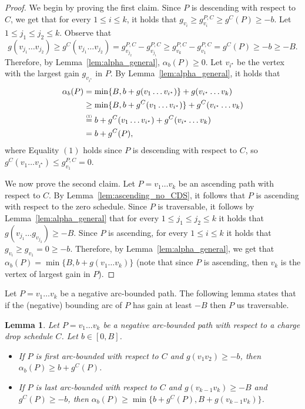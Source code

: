 \documentclass[11pt]{article}
\newtheorem{lemma}[theorem]{Lemma}
\newcommand\numeq[1]{\stackrel{\scriptscriptstyle(\mkern-1.5mu#1\mkern-1.5mu)}{=}}
\begin{document}
\begin{proof}
    We begin by proving the first claim. Since $P$ is descending with respect to $C$, we get that for every $1\le i \le k$, it holds that $g_{v_{i}} \ge g^{P,C}_{v_i} \ge g^C(P) \ge -b$. Let $1\le j_1 \le j_2 \le k$. Observe that
    \[g(v_{j_1} \ldots v_{j_2}) \ge g^C(v_{j_1} \ldots v_{j_2})  = g^{P,C}_{v_{j_2}} - g^{P,C}_{v_{j_1}} 
    \ge g^{P,C}_{v_{k}} - g^{P,C}_{v_{1}} = g^C(P) \ge -b \ge -B.
    \]
    Therefore, by Lemma~\ref{lem:alpha_general}, $\alpha_b(P)\ge 0$. Let $v_{i^\star}$ be the vertex with the largest gain $g_{v_{i^\star}}$ in $P$. By Lemma~\ref{lem:alpha_general}, it holds that 
    \begin{align*}
        \alpha_b(P) 
        &=  \min \{B, b + g(v_1\ldots v_{i^\star}) \} + g(v_{i^\star} \ldots v_k) 
        \\ &\ge
        \min \{B, b + g^C(v_1\ldots v_{i^\star}) \} + g^C(v_{i^\star} \ldots v_k)
        \\&\numeq{1}
        b + g^C(v_1\ldots v_{i^\star})  + g^C(v_{i^\star} \ldots v_k) 
        \\&= b + g^C(P),
    \end{align*}    
    where Equality $(1)$ holds since $P$ is descending with respect to $C$, so  $g^C(v_1\ldots v_{i^\star}) \le g^{P,C}_{v_1} = 0$.
    
    We now prove the second claim.
    Let $P=v_1\ldots v_k$ be an ascending path with respect to $C$. By Lemma~\ref{lem:ascending_no_CDS}, it follows that $P$ is ascending with respect to the zero schedule.
    Since $P$ is traversable, it follows by Lemma~\ref{lem:alpha_general} that for every $1\le j_1 \le j_2 \le k$ it holds that $g(v_{j_1}\ldots g_{v_{j_2}}) \ge -B$. Since $P$ is ascending, for every $1\le i \le k$ it holds that $g_{v_{i}} \ge g_{v_1} = 0 \ge -b$. Therefore,
    by Lemma~\ref{lem:alpha_general}, we get that 
        $\alpha_b(P) = \min \{B, b+ g(v_1\ldots v_k) \}$ (note that since $P$ is ascending, then $v_k$ is the vertex of largest gain in $P$).
\end{proof}

Let $P= v_1 \ldots v_k$ be a negative arc-bounded path. The following lemma states that if the (negative) bounding arc of $P$ has gain at least $-B$ then $P$ us traversable.

\begin{lemma}\label{lemma:alpha-of-arc-bounded}
    Let $P=v_1\ldots v_k$ be a negative arc-bounded path with respect to a charge drop schedule $C$. Let $b\in [0,B]$.
    \begin{itemize}
        \item If $P$ is first arc-bounded with respect to $C$ and $g(v_1 v_2)\ge -b$, 
        then $\alpha_b(P) \ge b+g^C(P)$.
        \item If $P$ is last arc-bounded with respect to $C$ and $g(v_{k-1} v_k)\ge -B$ and $ g^C(P)\ge -b$, then   $\alpha_b(P) \ge \min \{  b+g^C(P), B + g(v_{k-1} v_k) \}$.
    \end{itemize}
\end{lemma}
\end{document}
